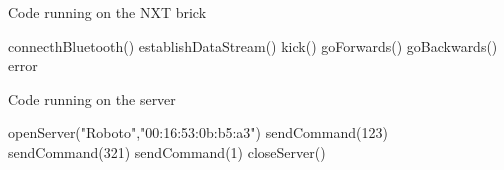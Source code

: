 \documentclass[conference,12pt]{IEEEtran}
\begin{document}
\begin{algorithm}
\label{fig:codeClient}
\caption{Code running on the NXT brick}
\begin{algorithmic}[1]
\STATE connecthBluetooth()
\STATE establishDataStream()
		\STATE kick()
		\STATE goForwards()
		\STATE goBackwards()
	\ELSE
		\STATE error
	\ENDIF
\ENDWHILE
\end{algorithmic}
\end{algorithm}

\begin{algorithm}
\label{fig:codeServer}
\caption{Code running on the server}
\begin{algorithmic}[1]
\STATE openServer("Roboto","00:16:53:0b:b5:a3")
\STATE sendCommand(123)
\STATE sendCommand(321)
\STATE sendCommand(1)
\STATE closeServer()
\end{algorithmic}
\end{algorithm}
	
\end{document}
